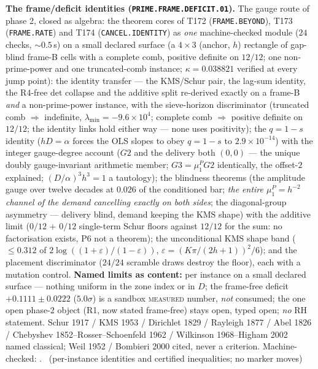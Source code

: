 \par\smallskip\noindent\textbf{The frame/deficit identities
(\texttt{PRIME.FRAME.DEFICIT.01}).}
The gauge route of phase 2, closed as algebra: the theorem cores of
T172 (\texttt{FRAME.BEYOND}), T173 (\texttt{FRAME.RATE}) and T174
(\texttt{CANCEL.IDENTITY}) as \emph{one} machine-checked module ($24$
checks, ${\sim}0.5$\,s) on a small declared surface (a $4\times3$
(anchor, $h$) rectangle of gap-blind frame-B cells with a complete
comb, positive definite on $12/12$; one non-prime-power and one
truncated-comb instance; $\kappa=0.038821$ verified at every jump
point): the identity transfer --- the KMS/Schur pair, the lag-sum
identity, the R4-free det collapse and the additive split re-derived
exactly on a frame-B \emph{and} a non-prime-power instance, with the
sieve-horizon discriminator (truncated comb $\Rightarrow$ indefinite,
$\lambda_{\min}=-9.6\times10^{4}$; complete comb $\Rightarrow$ positive
definite on $12/12$; the identity links hold either way --- none uses
positivity); the $q=1-s$ identity ($hD=\alpha$ forces the OLS slopes to
obey $q=1-s$ to $2.9\times10^{-14}$) with the integer gauge-degree
account ($G2$ and the delivery both $(0,0)$ --- the unique doubly
gauge-invariant arithmetic member; $G3=\mu^P_1G2$ identically, the
offset-$2$ explained; $(D/\alpha)^3h^3=1$ a tautology); the blindness
theorems (the amplitude gauge over twelve decades at $0.026$ of the
conditioned bar; \emph{the entire $\mu^P_1=h^{-2}$ channel of the
demand cancelling exactly on both sides}; the diagonal-group asymmetry
--- delivery blind, demand keeping the KMS shape) with the additive
limit ($0/12$ $+$ $0/12$ single-term Schur floors against $12/12$ for
the sum: no factorisation exists, P6 not a theorem); the unconditional
KMS shape band ($\le0.312$ of $2\log((1+\varepsilon)/(1-\varepsilon))$,
$\varepsilon=(K\pi/(2h+1))^2/6$); and the placement discriminator
($24/24$ scramble draws destroy the floor), each with a mutation
control.
\textbf{Named limits as content:} per instance on a small declared
surface --- nothing uniform in the zone index or in $D$; the frame-free
deficit $+0.1111\pm0.0222$ ($5.0\sigma$) is a sandbox
\textsc{measured} number, \emph{not} consumed; the one open phase-2
object (R1, now stated frame-free) stays open, typed open; \emph{no} RH
statement. Schur 1917 / KMS 1953 / Dirichlet 1829 / Rayleigh 1877 /
Abel 1826 / Chebyshev 1852--Rosser--Schoenfeld 1962 / Wilkinson
1968--Higham 2002 named classical; Weil 1952 / Bombieri 2000 cited,
never a criterion. Machine-checked:
.
\mE\ (per-instance identities and certified inequalities; no marker moves)
\par\smallskip


